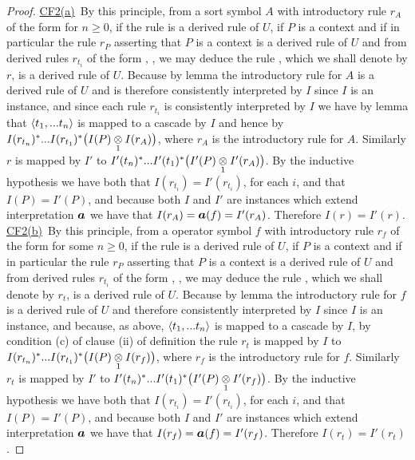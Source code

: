 \begin{proof}
\underline{CF2(a)}\ By this principle, from a sort symbol $A$ with introductory rule $r_A$ of the form  for  $n \geq 0$, 
if the rule  is a derived rule of $U$,
if $P$ is a context and if in particular the rule $r_P$ asserting that $P$ is a context is a derived rule of $U$
and from derived rules $r_{t_i}$ of the form , \foreachi, we may deduce
the rule , which we shall denote by $r$, is a derived rule of $U$. 
Because by lemma  the introductory rule for $A$ is a derived rule of $U$  and is therefore consistently interpreted by $I$
since $I$ is an instance, and since  each rule $r_{t_i}$ is consistently interpreted by $I$ we have by lemma 
that $\tuple{\tn}$ is mapped to a cascade by $I$ and hence by 
$I(r_{t_n})^* ... I(r_{t_1})^*\big(\crossx{I(P)}{I(r_A)}{1}\big)$, where $r_A$ is the introductory rule for $A$.
Similarly $r$ is mapped by $I'$ to
$I'(t_n)^* ... I'(t_1)^*\big(\crossx{I'(P)}{I'(r_A)}{1}\big)$.
By the inductive hypothesis we have both that $I(r_{t_i})=I'(r_{t_i})$, for each $i$, and that $I(P)=I'(P)$,  and 
because both $I$ and $I'$ are instances which extend interpretation $\iI$
we have that $I(r_A)=\iI(f)=I'(r_A)$. Therefore $I(r)=I'(r)$.
\\

\underline{CF2(b)}\ By this principle, from a operator symbol $f$ with introductory rule $r_f$ of the form  for some $n \geq 0$, if the rule  is a derived rule of $U$,
if $P$ is a context and if in particular the rule $r_P$ asserting that $P$ is a context is a derived rule of $U$
and from derived rules $r_{t_i}$ of the form , \foreachi, we may deduce
the rule , which we shall denote by $r_t$, is a derived rule of $U$. 
Because by lemma the introductory rule for $f$ is a derived rule of $U$ and therefore consistently interpreted by $I$
since $I$ is an instance, and because, as above,  $\tuple{\tn}$ is mapped to a cascade by $I$,
by condition (c) of clause (ii) of definition  the rule $r_t$ is mapped  by $I$ to
$I(r_{t_n})^* ... I(r_{t_1})^*\big(\crossx{I(P)}{I(r_f)}{1}\big)$, where $r_f$ is the introductory rule for $f$.
Similarly $r_t$ is mapped by $I'$ to
$I'(t_n)^* ... I'(t_1)^*\big(\crossx{I'(P)}{I'(r_f)}{1}\big)$.
By the inductive hypothesis we have both that $I(r_{t_i})=I'(r_{t_i})$, for each $i$, and that $I(P)=I'(P)$,  and 
because both $I$ and $I'$ are instances which extend interpretation $\iI$
we have that $I(r_f)=\iI(f)=I'(r_f)$. Therefore $I(r_t)=I'(r_t)$.
\end{proof}

